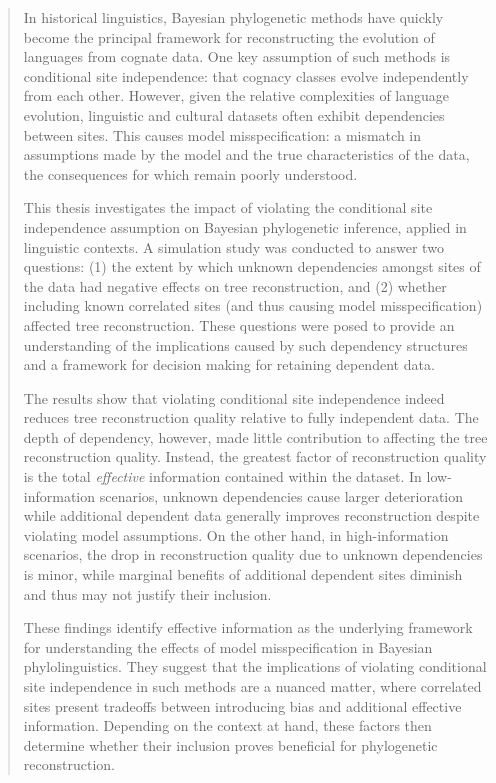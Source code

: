 \documentclass[a4paper,11pt, twoside]{report}
\begin{document}


\begin{abstract}
In historical linguistics, Bayesian phylogenetic methods have quickly become the principal framework for reconstructing the evolution of languages from cognate data. One key assumption of such methods is conditional site independence: that cognacy classes evolve independently from each other. However, given the relative complexities of language evolution, linguistic and cultural datasets often exhibit dependencies between sites. This causes model misspecification: a mismatch in assumptions made by the model and the true characteristics of the data, the consequences for which remain poorly understood.

This thesis investigates the impact of violating the conditional site independence assumption on Bayesian phylogenetic inference, applied in linguistic contexts. A simulation study was conducted to answer two questions: (1) the extent by which unknown dependencies amongst sites of the data had negative effects on tree reconstruction, and (2) whether including known correlated sites (and thus causing model misspecification) affected tree reconstruction. These questions were posed to provide an understanding of the implications caused by such dependency structures and a framework for decision making for retaining dependent data.

The results show that violating conditional site independence indeed reduces tree reconstruction quality relative to fully independent data. The depth of dependency, however, made little contribution to affecting the tree reconstruction quality. Instead, the greatest factor of reconstruction quality is the total \textit{effective} information contained within the dataset. In low-information scenarios, unknown dependencies cause larger deterioration while additional dependent data generally improves reconstruction despite violating model assumptions. On the other hand, in high-information scenarios, the drop in reconstruction quality due to unknown dependencies is minor, while marginal benefits of additional dependent sites diminish and thus may not justify their inclusion.

These findings identify effective information as the underlying framework for understanding the effects of model misspecification in Bayesian phylolinguistics. They suggest that the implications of violating conditional site independence in such methods are a nuanced matter, where correlated sites present tradeoffs between introducing bias and additional effective information. Depending on the context at hand, these factors then determine whether their inclusion proves beneficial for phylogenetic reconstruction.

\end{abstract}
 
\end{document}
